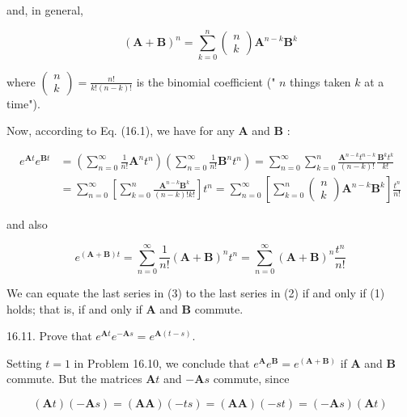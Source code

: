 \documentclass[10pt]{article}
\begin{document}
and, in general,

\[
(\mathbf{A}+\mathbf{B})^{n}=\sum_{k=0}^{n}\left(\begin{array}{l}
n  \tag{1}\\
k
\end{array}\right) \mathbf{A}^{n-k} \mathbf{B}^{k}
\]

where $\left(\begin{array}{l}n \\ k\end{array}\right)=\frac{n !}{k !(n-k) !}$ is the binomial coefficient (" $n$ things taken $k$ at a time").

Now, according to Eq. (16.1), we have for any $\mathbf{A}$ and $\mathbf{B}$ :


\begin{align*}
e^{\mathbf{A} t} e^{\mathbf{B} t} & =\left(\sum_{n=0}^{\infty} \frac{1}{n !} \mathbf{A}^{n} t^{n}\right)\left(\sum_{n=0}^{\infty} \frac{1}{n !} \mathbf{B}^{n} t^{n}\right)=\sum_{n=0}^{\infty} \sum_{k=0}^{n} \frac{\mathbf{A}^{n-k} t^{n-k}}{(n-k) !} \frac{\mathbf{B}^{k} t^{k}}{k !} \\
& =\sum_{n=0}^{\infty}\left[\sum_{k=0}^{n} \frac{\mathbf{A}^{n-k} \mathbf{B}^{k}}{(n-k) ! k !}\right] t^{n}=\sum_{n=0}^{\infty}\left[\sum_{k=0}^{n}\left(\begin{array}{l}
n \\
k
\end{array}\right) \mathbf{A}^{n-k} \mathbf{B}^{k}\right] \frac{t^{n}}{n !} \tag{2}
\end{align*}


and also


\begin{equation*}
e^{(\mathbf{A}+\mathbf{B}) t}=\sum_{n=0}^{\infty} \frac{1}{n !}(\mathbf{A}+\mathbf{B})^{n} t^{n}=\sum_{n=0}^{\infty}(\mathbf{A}+\mathbf{B})^{n} \frac{t^{n}}{n !} \tag{3}
\end{equation*}


We can equate the last series in (3) to the last series in (2) if and only if (1) holds; that is, if and only if $\mathbf{A}$ and $\mathbf{B}$ commute.

16.11. Prove that $e^{\mathbf{A} t} e^{-\mathbf{A} s}=e^{\mathbf{A}(t-s)}$.

Setting $t=1$ in Problem 16.10, we conclude that $e^{\mathbf{A}} e^{\mathbf{B}}=e^{(\mathbf{A}+\mathbf{B})}$ if $\mathbf{A}$ and $\mathbf{B}$ commute. But the matrices $\mathbf{A} t$ and $-\mathbf{A} s$ commute, since

$$
(\mathbf{A} t)(-\mathbf{A} s)=(\mathbf{A} \mathbf{A})(-t s)=(\mathbf{A} \mathbf{A})(-s t)=(-\mathbf{A} s)(\mathbf{A} t)
$$
\end{document}
